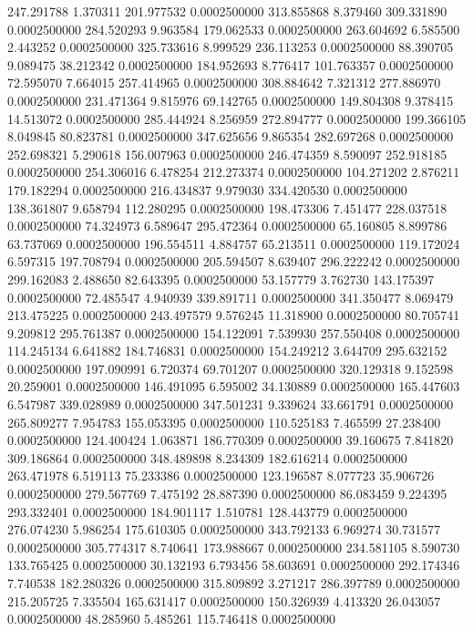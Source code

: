 247.291788 1.370311 201.977532 0.0002500000
313.855868 8.379460 309.331890 0.0002500000
284.520293 9.963584 179.062533 0.0002500000
263.604692 6.585500 2.443252 0.0002500000
325.733616 8.999529 236.113253 0.0002500000
88.390705 9.089475 38.212342 0.0002500000
184.952693 8.776417 101.763357 0.0002500000
72.595070 7.664015 257.414965 0.0002500000
308.884642 7.321312 277.886970 0.0002500000
231.471364 9.815976 69.142765 0.0002500000
149.804308 9.378415 14.513072 0.0002500000
285.444924 8.256959 272.894777 0.0002500000
199.366105 8.049845 80.823781 0.0002500000
347.625656 9.865354 282.697268 0.0002500000
252.698321 5.290618 156.007963 0.0002500000
246.474359 8.590097 252.918185 0.0002500000
254.306016 6.478254 212.273374 0.0002500000
104.271202 2.876211 179.182294 0.0002500000
216.434837 9.979030 334.420530 0.0002500000
138.361807 9.658794 112.280295 0.0002500000
198.473306 7.451477 228.037518 0.0002500000
74.324973 6.589647 295.472364 0.0002500000
65.160805 8.899786 63.737069 0.0002500000
196.554511 4.884757 65.213511 0.0002500000
119.172024 6.597315 197.708794 0.0002500000
205.594507 8.639407 296.222242 0.0002500000
299.162083 2.488650 82.643395 0.0002500000
53.157779 3.762730 143.175397 0.0002500000
72.485547 4.940939 339.891711 0.0002500000
341.350477 8.069479 213.475225 0.0002500000
243.497579 9.576245 11.318900 0.0002500000
80.705741 9.209812 295.761387 0.0002500000
154.122091 7.539930 257.550408 0.0002500000
114.245134 6.641882 184.746831 0.0002500000
154.249212 3.644709 295.632152 0.0002500000
197.090991 6.720374 69.701207 0.0002500000
320.129318 9.152598 20.259001 0.0002500000
146.491095 6.595002 34.130889 0.0002500000
165.447603 6.547987 339.028989 0.0002500000
347.501231 9.339624 33.661791 0.0002500000
265.809277 7.954783 155.053395 0.0002500000
110.525183 7.465599 27.238400 0.0002500000
124.400424 1.063871 186.770309 0.0002500000
39.160675 7.841820 309.186864 0.0002500000
348.489898 8.234309 182.616214 0.0002500000
263.471978 6.519113 75.233386 0.0002500000
123.196587 8.077723 35.906726 0.0002500000
279.567769 7.475192 28.887390 0.0002500000
86.083459 9.224395 293.332401 0.0002500000
184.901117 1.510781 128.443779 0.0002500000
276.074230 5.986254 175.610305 0.0002500000
343.792133 6.969274 30.731577 0.0002500000
305.774317 8.740641 173.988667 0.0002500000
234.581105 8.590730 133.765425 0.0002500000
30.132193 6.793456 58.603691 0.0002500000
292.174346 7.740538 182.280326 0.0002500000
315.809892 3.271217 286.397789 0.0002500000
215.205725 7.335504 165.631417 0.0002500000
150.326939 4.413320 26.043057 0.0002500000
48.285960 5.485261 115.746418 0.0002500000

